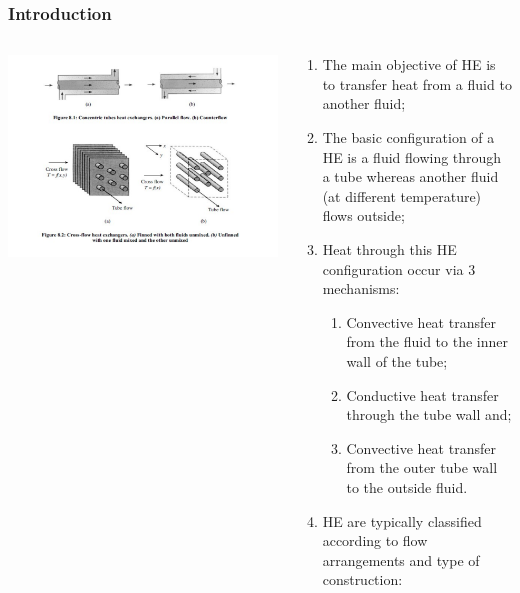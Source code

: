 \documentclass[10pt,compress]{beamer}
\begin{document}
\begin{frame}
  \frametitle{Introduction}
    \begin{columns}
       \begin{column}[l]{0.5\linewidth}
         \includegraphics[width=1.3\columnwidth,clip]{./Pics/HeatExchangers_Classification}
       \end{column}
       \begin{column}[l]{0.5\linewidth}
         \begin{enumerate}\scriptsize
            \item<1-> The main objective of HE is to transfer heat from a fluid to another fluid;
            \item<1-> The basic configuration of a HE is a fluid flowing through a tube whereas another fluid (at different temperature) flows outside;
            \item<2-> Heat through this HE configuration occur via 3 mechanisms:
              \begin{enumerate}\scriptsize
                 \item<2-> Convective heat transfer from the fluid to the inner wall of the tube;
                 \item<2-> Conductive heat transfer through the tube wall and;
                 \item<2-> Convective heat transfer from the outer tube wall to the outside fluid.
              \end{enumerate}
            \item<3-> HE are typically classified according to flow arrangements and type of construction:

\end{enumerate}
\end{column}
\end{columns}
\end{frame}
\end{document}
